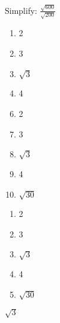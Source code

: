 




   Simplify: $\frac{\sqrt{600}}{\sqrt{200}}$


\ifsat
	\begin{enumerate}[label=\Alph*)]
		\item   2 
		\item  3
		\item  $\sqrt{3}$%
		\item  4
	\end{enumerate}
\else
\fi

\ifacteven
	\begin{enumerate}[label=\textbf{\Alph*.},itemsep=\fill,align=left]
		\setcounter{enumii}{5}
		\item   2 
		\item  3
		\item  $\sqrt{3}$%
		\addtocounter{enumii}{1}
		\item  4
		\item  $\sqrt{30}$
	\end{enumerate}
\else
\fi

\ifactodd
	\begin{enumerate}[label=\textbf{\Alph*.},itemsep=\fill,align=left]
		\item   2 
		\item  3
		\item  $\sqrt{3}$%
		\item  4
		\item  $\sqrt{30}$
	\end{enumerate}
\else
\fi

\ifgridin
  $\sqrt{3}$%
		
\else
\fi

